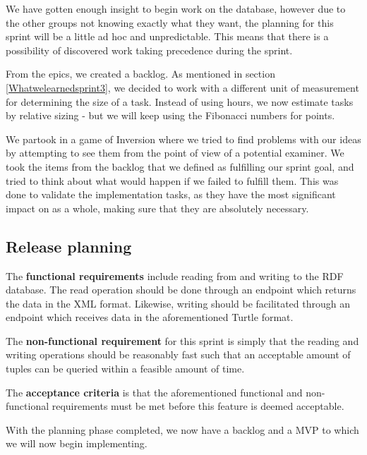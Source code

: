We have gotten enough insight to begin work on the database, however due to the other groups not knowing exactly what they want, the planning for this sprint will be a little ad hoc and unpredictable.  
This means that there is a possibility of discovered work taking precedence during the sprint.

From the epics, we created a backlog. As mentioned in section \ref{Whatwelearnedsprint3}, we decided to work with a different unit of measurement for determining the size of a task.
Instead of using hours, we now estimate tasks by relative sizing - but we will keep using the Fibonacci numbers for points.

We partook in a game of Inversion \cite{InversionThinking} where we tried to find problems with our ideas by attempting to see them from the point of view of a potential examiner. 
We took the items from the backlog that we defined as fulfilling our sprint goal, and tried to think about what would happen if we failed to fulfill them. 
This was done to validate the implementation tasks, as they have the most significant impact on \knox{} as a whole, making sure that they are absolutely necessary. 

\subsection*{Release planning}
The \textbf{functional requirements} include reading from and writing to the RDF database. 
The read operation should be done through an endpoint which returns the data in the XML format.
Likewise, writing should be facilitated through an endpoint which receives data in the aforementioned Turtle format.


The \textbf{non-functional requirement} for this sprint is simply that the reading and writing operations should be reasonably fast such that an acceptable amount of tuples can be queried within a feasible amount of time.


The \textbf{acceptance criteria} is that the aforementioned functional and non-functional requirements must be met before this feature is deemed acceptable. 


With the planning phase completed, we now have a backlog and a MVP to which we will now begin implementing.